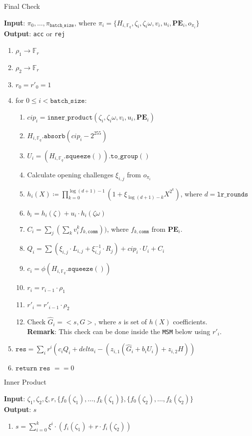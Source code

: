 \begin{algorithm}[H]
\caption{Final Check}
\textbf{Input}: $\pi_0, \dots, \pi_{\texttt{batch\_size}}$, where $\pi_i = \{H_{i, \mathbb{F}_q}, \zeta_i, \zeta_i\omega, v_i, u_i,
		\textbf{PE}_i, o_{\pi_i} \}$ \\
\textbf{Output}: \texttt{acc} or \texttt{rej}
\begin{enumerate}
	\item $\rho_1 \rightarrow \mathbb{F}_r$
	\item $\rho_2 \rightarrow \mathbb{F}_r$
	\item $r_0 = r'_0 = 1$
	\item for $0 \leq i < \texttt{batch\_size}$:
	\begin{enumerate}
		\item $cip_i = \texttt{inner\_product}(\zeta_i, \zeta_i\omega, v_i, u_i, \textbf{PE}_i)$
		\item $H_{i, \mathbb{F}_q}.\texttt{absorb}(cip_i - 2^{255})$
		\item $U_i = (H_{i, \mathbb{F}_q}.\texttt{squeeze}()).\texttt{to\_group}()$
		\item Calculate opening challenges $\xi_{i, j}$ from $o_{\pi_i}$
		\item $h_i(X) \coloneqq \prod_{k=0}^{\log(d+1) - 1}(1 + \xi_{\log(d+1)-k}X^{2^k})$, where $d = \texttt{lr\_rounds}$
		\item $b_i = h_i(\zeta) + u_i \cdot h_i(\zeta\omega)$
		\item $C_i = \sum\limits_{j}(\sum\limits_{k}v_i^k f_{k, \texttt{comm}}))$, where $f_{k, \texttt{comm}}$ from $\textbf{PE}_i$.
		\item $Q_i = \sum (\xi_{i, j} \cdot L_{i, j} + \xi_{i, j}^{-1} \cdot R_j) + cip_i \cdot U_i + C_i$
		\item $c_i = \phi(H_{i, \mathbb{F}_q}.\texttt{squeeze}())$
		\item $r_i = r_{i - 1} \cdot \rho_1$
		\item $r'_i = r'_{i - 1} \cdot \rho_2$
		\item Check $\hat{G}_i = <s, G>$, where $s$ is set of $h(X)$ coefficients. \\
		\textbf{Remark}: This check can be done inside the \texttt{MSM} below using $r'_i$.
	\end{enumerate}
	\item $\texttt{res} = \sum\limits_i r^i (c_i Q_i + delta_i - ( z_{i, 1} (\hat{G}_i + b_i U_i) + z_{i, 2} H ))$
	\item $\texttt{return res } == 0$
\end{enumerate}
\end{algorithm}

\begin{algorithm}[H]
\caption{Inner Product}
\textbf{Input}: $\zeta_1, \zeta_2, \xi, r, \{f_0(\zeta_1), \dots, f_k(\zeta_1) \}, \{f_0(\zeta_2), \dots, f_k(\zeta_2) \}$ \\ %
\textbf{Output}: $s$
\begin{enumerate}
	\item $s = \sum\limits_{i = 0}^{k} \xi^i \cdot (f_i(\zeta_1) + r \cdot f_i(\zeta_2))$
\end{enumerate}
\end{algorithm}